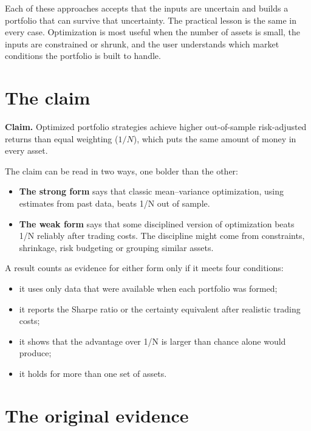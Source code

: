 Each of these approaches accepts that the inputs are uncertain and builds a portfolio that can survive that uncertainty. The practical lesson is the same in every case. Optimization is most useful when the number of assets is small, the inputs are constrained or shrunk, and the user understands which market conditions the portfolio is built to handle.
\section{The claim}
\label{sec:12-claim}

\begin{callout}
\textbf{Claim.} Optimized portfolio strategies achieve higher out-of-sample risk-adjusted returns than equal weighting ($1/N$), which puts the same amount of money in every asset.
\end{callout}

The claim can be read in two ways, one bolder than the other:

\begin{itemize}
  \item \textbf{The strong form} says that classic mean--variance optimization, using estimates from past data, beats 1/N out of sample.
  \item \textbf{The weak form} says that some disciplined version of optimization beats 1/N reliably after trading costs. The discipline might come from constraints, shrinkage, risk budgeting or grouping similar assets.
\end{itemize}

A result counts as evidence for either form only if it meets four conditions:

\begin{itemize}
  \item it uses only data that were available when each portfolio was formed;
  \item it reports the Sharpe ratio or the certainty equivalent after realistic trading costs;
  \item it shows that the advantage over 1/N is larger than chance alone would produce;
  \item it holds for more than one set of assets.
\end{itemize}

\section{The original evidence}
\label{sec:12-evidence}


